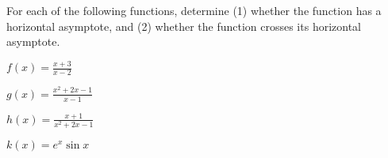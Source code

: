 \begin{activity}\label{A:0.6.5}
	For each of the following functions, determine (1) whether the function has a horizontal asymptote, and (2) whether the function crosses its horizontal asymptote.
\ba
		\item $f(x)=\displaystyle{\frac {x+3}{x-2}}$
		\item $g(x)=\displaystyle{\frac {x^{2}+2x-1}{x-1}}$
		\item $h(x)=\displaystyle{\frac {x+1}{x^{2}+2x-1}}$
		\item $k(x)=e^{x}\sin{x}$
\ea
\end{activity}\aftera
